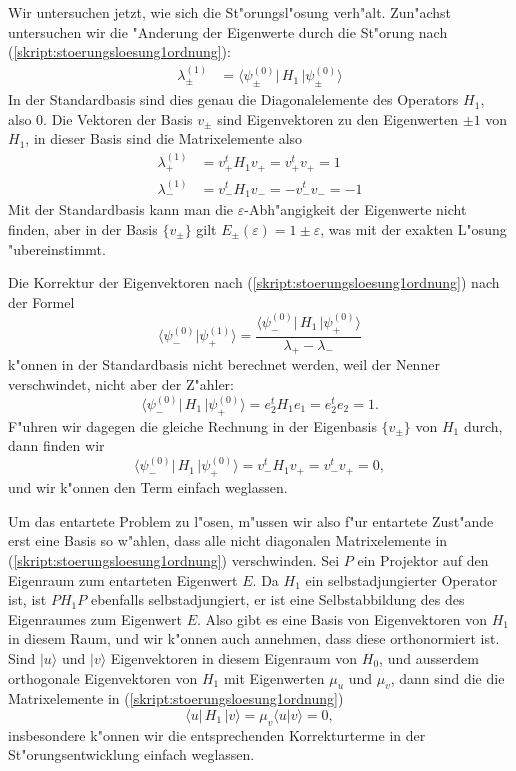 \begin{beispiel}
Wir untersuchen jetzt, wie sich die St"orungsl"osung verh"alt.
Zun"achst untersuchen wir die "Anderung der Eigenwerte durch die
St"orung nach (\ref{skript:stoerungsloesung1ordnung}):
\begin{align*}
\lambda_{\pm}^{(1)}
&=
\langle \psi_{\pm}^{(0)}|\, H_1 \,|\psi_{\pm}^{(0)}\rangle
\end{align*}
In der Standardbasis sind dies genau die Diagonalelemente des Operators $H_1$,
also $0$.
Die Vektoren der Basis $v_\pm$ sind Eigenvektoren zu den Eigenwerten
$\pm1$ von $H_1$, in dieser Basis sind die Matrixelemente also
\begin{align*}
\lambda_+^{(1)}
&=
v_+^tH_1v_+=v_+^tv_+=1\\
\lambda_-^{(1)}
&=
v_-^tH_1v_-=-v_-^tv_-=-1
\end{align*}
Mit der Standardbasis kann man die $\varepsilon$-Abh"angigkeit der
Eigenwerte nicht finden, aber in der Basis $\{v_\pm\}$ gilt
$E_\pm(\varepsilon)=1\pm\varepsilon$, was mit der exakten L"osung
"ubereinstimmt.

Die Korrektur der Eigenvektoren nach (\ref{skript:stoerungsloesung1ordnung})
nach der Formel
\[
\langle\psi_-^{(0)}|\psi_+^{(1)}\rangle
=
\frac{
\langle\psi_-^{(0)}|\,H_1\,|\psi_+^{(0)}\rangle
}{
\lambda_+-\lambda_-
}
\]
k"onnen in der Standardbasis nicht berechnet werden, weil der Nenner
verschwindet, nicht aber der Z"ahler:
\[
\langle\psi_-^{(0)}|\,H_1\,|\psi_+^{(0)}\rangle
=
e_2^tH_1e_1=e_2^te_2=1.
\]
F"uhren wir dagegen die gleiche Rechnung in der Eigenbasis $\{v_\pm\}$
von $H_1$ durch, dann finden wir
\[
\langle\psi_-^{(0)}|\,H_1\,|\psi_+^{(0)}\rangle
=
v_-^tH_1v_+=v_-^tv_+=0,
\]
und wir k"onnen den Term einfach weglassen.
\end{beispiel}

Um das entartete Problem zu l"osen, m"ussen wir also f"ur entartete
Zust"ande erst eine Basis so w"ahlen, dass alle nicht
diagonalen Matrixelemente in (\ref{skript:stoerungsloesung1ordnung}) verschwinden.
Sei $P$ ein Projektor auf den Eigenraum zum entarteten Eigenwert $E$.
Da $H_1$ ein selbstadjungierter Operator ist, ist $PH_1P$ ebenfalls
selbstadjungiert, er ist eine Selbstabbildung des des
Eigenraumes zum Eigenwert $E$.
Also gibt es eine Basis von Eigenvektoren von $H_1$ in diesem Raum,
und wir k"onnen auch annehmen, dass diese orthonormiert ist.
Sind $|u\rangle$ und $|v\rangle$ Eigenvektoren in diesem Eigenraum von
$H_0$, und ausserdem orthogonale Eigenvektoren von $H_1$ mit Eigenwerten
$\mu_u$ und $\mu_v$, dann sind die
die Matrixelemente in (\ref{skript:stoerungsloesung1ordnung}) 
\[
\langle u|\,H_1\,|v\rangle = \mu_v\langle u|v\rangle=0,
\]
insbesondere k"onnen wir die entsprechenden Korrekturterme in der
St"orungsentwicklung einfach weglassen.

